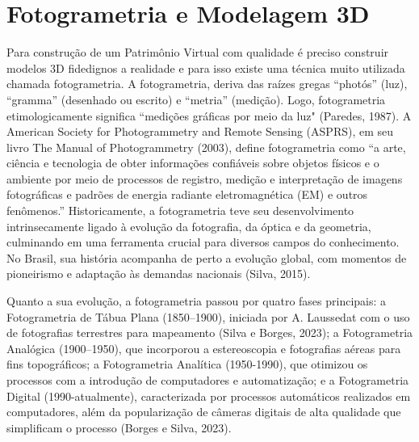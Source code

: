 \section{Fotogrametria e Modelagem 3D}
Para construção de um Patrimônio Virtual com qualidade é preciso construir modelos 3D fidedignos a realidade e para isso existe uma técnica muito utilizada chamada fotogrametria.
A fotogrametria, deriva das raízes gregas “photós” (luz), “gramma” (desenhado ou escrito) e “metria” (medição). Logo, fotogrametria etimologicamente significa “medições gráficas por meio da luz" (Paredes, 1987). A American Society for Photogrammetry and Remote Sensing (ASPRS), em seu livro The Manual of Photogrammetry (2003), define fotogrametria como “a arte, ciência e tecnologia de obter informações confiáveis sobre objetos físicos e o ambiente por meio de processos de registro, medição e interpretação de imagens fotográficas e padrões de energia radiante eletromagnética (EM) e outros fenômenos.”
Historicamente, a fotogrametria  teve seu desenvolvimento intrinsecamente ligado à evolução da fotografia, da óptica e da geometria, culminando em uma ferramenta crucial para diversos campos do conhecimento. No Brasil, sua história acompanha de perto a evolução global, com momentos de pioneirismo e adaptação às demandas nacionais (Silva, 2015).

Quanto a sua evolução, a fotogrametria passou por quatro fases principais: a Fotogrametria de Tábua Plana (1850–1900), iniciada por A. Laussedat com o uso de fotografias terrestres para mapeamento (Silva e Borges, 2023); a Fotogrametria Analógica (1900–1950), que incorporou a estereoscopia e fotografias aéreas para fins topográficos; a Fotogrametria Analítica (1950-1990), que otimizou os processos com a introdução de computadores e automatização; e a Fotogrametria Digital (1990-atualmente), caracterizada por processos automáticos realizados em computadores, além da popularização de câmeras digitais de alta qualidade que simplificam o processo (Borges e Silva, 2023).

